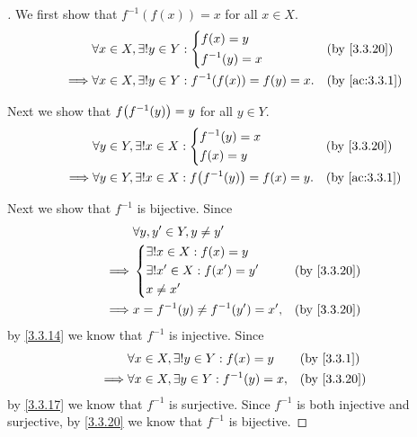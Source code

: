 \begin{proof}[]
  We first show that \(f^{-1}(f(x)) = x\) for all \(x \in X\).
  \begin{align*}
             & \forall x \in X, \exists! y \in Y : \begin{dcases}
                                                     f(x) = y \\
                                                     f^{-1}(y) = x
                                                   \end{dcases}              &  & \by{3.3.20}     \\
    \implies & \forall x \in X, \exists! y \in Y : f^{-1}\pa{f(x)} = f(y) = x. &  & \by{ac:3.3.1}
  \end{align*}

  Next we show that \(f\pa{f^{-1}(y)} = y\) for all \(y \in Y\).
  \begin{align*}
             & \forall y \in Y, \exists! x \in X : \begin{dcases}
                                                     f^{-1}(y) = x \\
                                                     f(x) = y
                                                   \end{dcases}              &  & \by{3.3.20}     \\
    \implies & \forall y \in Y, \exists! x \in X : f\pa{f^{-1}(y)} = f(x) = y. &  & \by{ac:3.3.1}
  \end{align*}

  Next we show that \(f^{-1}\) is bijective.
  Since
  \begin{align*}
             & \forall y, y' \in Y, y \neq y'                       \\
    \implies & \begin{dcases}
                 \exists! x \in X : f(x) = y    \\
                 \exists! x' \in X : f(x') = y' \\
                 x \neq x'
               \end{dcases}   &  & \by{3.3.20}                      \\
    \implies & x = f^{-1}(y) \neq f^{-1}(y') = x', &  & \by{3.3.20}
  \end{align*}
  by \cref{3.3.14} we know that \(f^{-1}\) is injective.
  Since
  \begin{align*}
             & \forall x \in X, \exists! y \in Y : f(x) = y      &  & \by{3.3.1}  \\
    \implies & \forall x \in X, \exists y \in Y : f^{-1}(y) = x, &  & \by{3.3.20}
  \end{align*}
  by \cref{3.3.17} we know that \(f^{-1}\) is surjective.
  Since \(f^{-1}\) is both injective and surjective, by \cref{3.3.20} we know that \(f^{-1}\) is bijective.


\end{proof}
